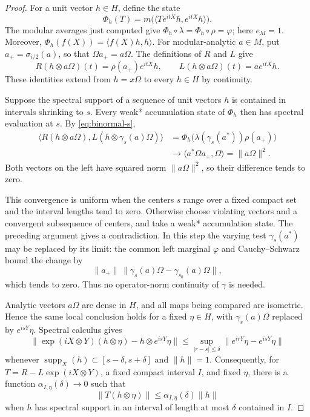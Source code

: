 \documentclass[11pt]{article}
\theoremstyle{definition}
\DeclareMathOperator{\supp}{supp}
\begin{document}
\begin{proof}
For a unit vector $h\in H$, define the state
\[
 \Phi_h(T)=m\big(\langle Te^{itX}h,e^{itX}h\rangle\big).
\]
The modular averages just computed give
$\Phi_h\circ\lambda=\Phi_h\circ\rho=\varphi$; here $e_M=1$.
Moreover, $\Phi_h(f(X))=\langle f(X)h,h\rangle$. For modular-analytic
$a\in M$, put $a_+=\sigma_{i/2}(a)$, so that $\Omega a_+=a\Omega$.
The definitions of $R$ and $L$ give
\[
 R(h\otimes a\Omega)(t)=\rho(a_+)e^{itX}h,\qquad
 L(h\otimes a\Omega)(t)=ae^{itX}h.
\]
These identities extend from $h=x\Omega$ to every $h\in H$ by continuity.

Suppose the spectral support of a sequence of unit vectors $h$ is contained
in intervals shrinking to $s$. Every weak* accumulation state of $\Phi_h$
then has spectral evaluation at $s$. By \eqref{eq:binormal-s},
\begin{align*}
 \langle R(h\otimes a\Omega),L(h\otimes\gamma_s(a)\Omega)\rangle
 &=\Phi_h\big(\lambda(\gamma_s(a^*))\rho(a_+)\big)\\
 &\longrightarrow\langle a^*\Omega a_+,\Omega\rangle
   =\|a\Omega\|^2.
\end{align*}
Both vectors on the left have squared norm $\|a\Omega\|^2$, so their
difference tends to zero.

This convergence is uniform when the centers $s$ range over a fixed compact
set and the interval lengths tend to zero. Otherwise choose violating
vectors and a convergent subsequence of centers, and take a weak*
accumulation state. The preceding argument gives a contradiction. In this
step the varying test $\gamma_s(a^*)$ may be replaced by its limit: the common
left marginal $\varphi$ and Cauchy--Schwarz bound the change by
\[
 \|a_+\|\,
 \|\gamma_s(a)\Omega-\gamma_{s_0}(a)\Omega\|,
\]
which tends to zero. Thus no operator-norm continuity of $\gamma$ is needed.

Analytic vectors $a\Omega$ are dense in $H$, and all maps being compared are
isometric. Hence the same local conclusion holds for a fixed $\eta\in H$,
with $\gamma_s(a)\Omega$ replaced by $e^{isY}\eta$. Spectral calculus gives
\[
 \|\exp(iX\otimes Y)(h\otimes\eta)-h\otimes e^{isY}\eta\|
 \le \sup_{|r-s|\le\delta}\|e^{irY}\eta-e^{isY}\eta\|
\]
whenever $\supp_X(h)\subset[s-\delta,s+\delta]$ and $\|h\|=1$.
Consequently, for $T=R-L\exp(iX\otimes Y)$, a fixed compact interval $I$,
and fixed $\eta$, there is a function $\alpha_{I,\eta}(\delta)\to0$ such that
\[
 \|T(h\otimes\eta)\|\le\alpha_{I,\eta}(\delta)\|h\|
\]
when $h$ has spectral support in an interval of length at most $\delta$
contained in $I$.


\end{proof}
\end{document}
